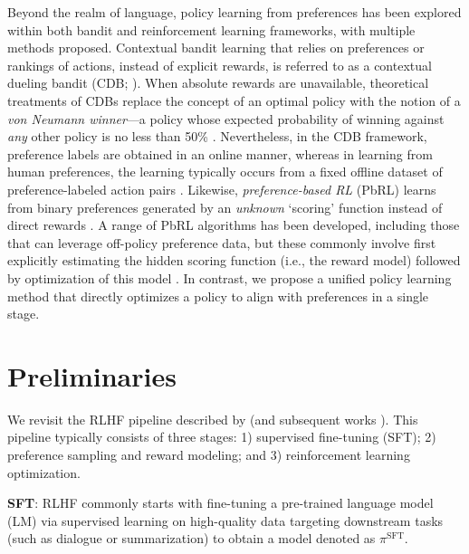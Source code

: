 Beyond the realm of language, policy learning from preferences has been explored within both bandit and reinforcement learning frameworks, with multiple methods proposed. Contextual bandit learning that relies on preferences or rankings of actions, instead of explicit rewards, is referred to as a contextual dueling bandit (CDB; \cite{yue2012karmed,dudik2015contextual}). When absolute rewards are unavailable, theoretical treatments of CDBs replace the concept of an optimal policy with the notion of a \textit{von Neumann winner}—a policy whose expected probability of winning against \textit{any} other policy is no less than 50\% \citep{dudik2015contextual}. Nevertheless, in the CDB framework, preference labels are obtained in an online manner, whereas in learning from human preferences, the learning typically occurs from a fixed offline dataset of preference-labeled action pairs \citep{yan2022human}. Likewise, \textit{preference-based RL} (PbRL) learns from binary preferences generated by an \textit{unknown} ‘scoring’ function instead of direct rewards \citep{BusaFekete2014,ruiz2023dueling}. A range of PbRL algorithms has been developed, including those that can leverage off-policy preference data, but these commonly involve first explicitly estimating the hidden scoring function (i.e., the reward model) followed by optimization of this model \citep{jain2013learning,BusaFekete2014,christiano2017deep,sadigh2017active,kupcsik2018learning}. In contrast, we propose a unified policy learning method that directly optimizes a policy to align with preferences in a single stage.

\section{Preliminaries}\label{section:prelims}

We revisit the RLHF pipeline described by \citeauthor{ziegler2020finetuning} (and subsequent works \citep{stiennon2022learning, bai2022training, ouyang2022training}). This pipeline typically consists of three stages: 1) supervised fine-tuning (SFT); 2) preference sampling and reward modeling; and 3) reinforcement learning optimization.

\textbf{SFT}: RLHF commonly starts with fine-tuning a pre-trained language model (LM) via supervised learning on high-quality data targeting downstream tasks (such as dialogue or summarization) to obtain a model denoted as $\pi^\text{SFT}$.

